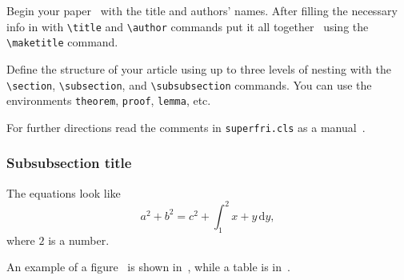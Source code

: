\documentclass{superfri}
\begin{document}
Begin your paper~\cite{DBLP:series/cogtech/354089408} with the title and authors' names. After filling the
necessary info in with \verb=\title= and \verb=\author= commands put it all
together~\cite{SIV2008} using the \verb=\maketitle= command.

Define the structure of your article using up to three levels of nesting with
the \verb=\section=, \verb=\subsection=, and \verb=\subsubsection= commands.
You can use the environments \verb=theorem=, \verb=proof=, \verb=lemma=, etc.

For further directions read the comments in \verb=superfri.cls= as a manual~\cite{DBLP:journals/pcs/SokolinskyS16}.

\subsubsection{Subsubsection title}

The equations look like
\begin{equation}
a^2 + b^2 = c^2 + \int_1^2 x+y \, \mathrm{d}y,
\end{equation}
where $2$ is a number.

An example of a figure~\cite{DBLP:journals/corr/Zhang16b} is shown in~, while a table
is in~.



\openaccess




\end{document}
